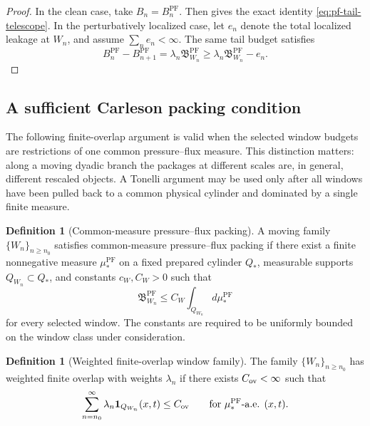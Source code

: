 \documentclass[11pt]{article}
\numberwithin{equation}{section}
\theoremstyle{plain}
\theoremstyle{definition}
\newtheorem{definition}[theorem]{Definition}
\theoremstyle{remark}
\newcommand{\PF}{\mathrm{PF}}
\newcommand{\bfB}{\mathfrak B}
\begin{document}
\begin{proof}
In the clean case, take \(B_n=B_n^{\PF}\).  Then  gives the exact identity \eqref{eq:pf-tail-telescope}.  In the perturbatively localized case, let \(e_n\) denote the total localized leakage at \(W_n\), and assume \(\sum_ne_n<\infty\).  The same tail budget satisfies
\[
        B_n^{\PF}-B_{n+1}^{\PF}
        =
        \lambda_n\bfB^{\PF}_{W_n}
        \ge
        \lambda_n\bfB^{\PF}_{W_n}-e_n.
\]
\end{proof}


\subsection{A sufficient Carleson packing condition}

The following finite-overlap argument is valid when the selected window
budgets are restrictions of one common pressure--flux measure.  This distinction
matters: along a moving dyadic branch the packages at different scales are, in
general, different rescaled objects.  A Tonelli argument may be used only after
all windows have been pulled back to a common physical cylinder and dominated
by a single finite measure.

\begin{definition}[Common-measure pressure--flux packing]
\label{def:common-measure-pf-packing}
A moving family \(\{W_n\}_{n\ge n_0}\) satisfies common-measure pressure--flux
packing if there exist a finite nonnegative measure \(\mu_*^{\PF}\) on a fixed
prepared cylinder \(Q_*\), measurable supports \(Q_{W_n}\subset Q_*\), and
constants \(c_W,C_W>0\) such that
\[
        \bfB^{\PF}_{W_n}
        \le
        C_W\int_{Q_{W_n}}d\mu_*^{\PF}
\]
for every selected window.  The constants are required to be uniformly bounded
on the window class under consideration.
\end{definition}

\begin{definition}[Weighted finite-overlap window family]
\label{def:weighted-finite-overlap}
The family \(\{W_n\}_{n\ge n_0}\) has weighted finite overlap with weights
\(\lambda_n\) if there exists \(C_{\rm ov}<\infty\) such that
\begin{equation}
        \sum_{n=n_0}^{\infty}\lambda_n\mathbf 1_{Q_{W_n}}(x,t)
        \le
        C_{\rm ov}
        \qquad
        \text{for }\mu_*^{\PF}\text{-a.e. }(x,t).
        \label{eq:weighted-finite-overlap}
\end{equation}
\end{definition}
\end{document}
